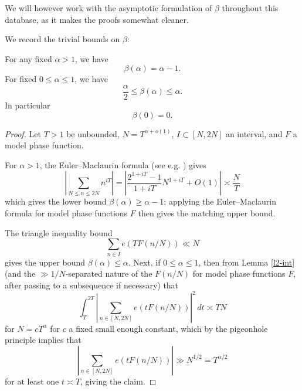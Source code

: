 We will however work with the asymptotic formulation of $\beta$ throughout this database, as it makes the proofs somewhat cleaner.

We record the trivial bounds on $\beta$:

\begin{lemma}\label{beta-triv}
\leanok
For any fixed $\alpha > 1$, we have
    $$ \beta(\alpha) = \alpha-1.$$
    For fixed $0 \leq \alpha \leq 1$, we have
    $$ \frac{\alpha}{2} \leq \beta(\alpha) \leq \alpha.$$
    In particular
    \begin{equation}\label{beta-0}
        \beta(0)=0.
    \end{equation}
    \end{lemma}


    \begin{proof}\leanok  Let $T > 1$ be unbounded, $N = T^{\alpha+o(1)}$, $I \subset [N,2N]$ an interval, and $F$ a model phase function.

        For $\alpha > 1$, the Euler--Maclaurin formula (see e.g. \cite[(2.1.2)]{titchmarsh_theory_1986}) gives
        \begin{equation}\label{nit}
            \left|\sum_{N \leq n \leq 2N} n^{iT}\right| = \left|\frac{2^{1+iT} - 1}{1+iT} N^{1+iT} + O(1)\right| \asymp \frac{N}{T}
        \end{equation}
        which gives the lower bound $\beta(\alpha) \geq \alpha-1$; applying the Euler--Maclaurin formula for model phase functions $F$ then gives the matching upper bound.

        The triangle inequality bound
        $$ \sum_{n \in I} e(T F(n/N)) \ll N$$
        gives the upper bound $\beta(\alpha) \leq \alpha$.  Next, if $0 \leq \alpha \leq 1$, then from Lemma \ref{l2-int} (and the $\gg 1/N$-separated nature of the $F(n/N)$ for model phase functions $F$, after passing to a subsequence if necessary) that
        $$ \int_T^{2T} \left|\sum_{n \in [N,2N]} e(t F(n/N)) \right|^2\, dt \asymp T N$$
    for $N = cT^\alpha$ for $c$ a fixed small enough constant, which by the pigeonhole principle implies that
    $$\left| \sum_{n \in [N,2N]}e(t F(n/N)) \right| \gg N^{1/2} = T^{\alpha/2}$$
    for at least one $t \asymp T$, giving the claim.
\end{proof}

